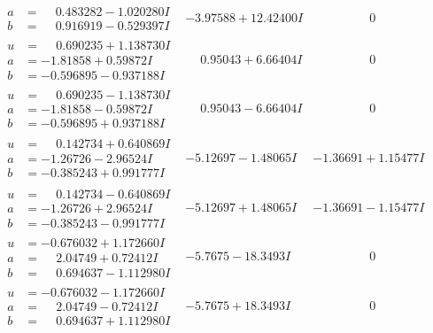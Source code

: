 \documentclass[1p]{elsarticle_modified}
\theoremstyle{definition}
\begin{document}
$$\begin{array}{c|c|c}
\begin{aligned}
a &= \phantom{-}0.483282 - 1.020280 I \\
b &= \phantom{-}0.916919 - 0.529397 I\end{aligned}
 & -3.97588 + 12.42400 I & \phantom{-0.000000 } 0 \\ \hline\begin{aligned}
u &= \phantom{-}0.690235 + 1.138730 I \\
a &= -1.81858 + 0.59872 I \\
b &= -0.596895 - 0.937188 I\end{aligned}
 & \phantom{-}0.95043 + 6.66404 I & \phantom{-0.000000 } 0 \\ \hline\begin{aligned}
u &= \phantom{-}0.690235 - 1.138730 I \\
a &= -1.81858 - 0.59872 I \\
b &= -0.596895 + 0.937188 I\end{aligned}
 & \phantom{-}0.95043 - 6.66404 I & \phantom{-0.000000 } 0 \\ \hline\begin{aligned}
u &= \phantom{-}0.142734 + 0.640869 I \\
a &= -1.26726 - 2.96524 I \\
b &= -0.385243 + 0.991777 I\end{aligned}
 & -5.12697 - 1.48065 I & -1.36691 + 1.15477 I \\ \hline\begin{aligned}
u &= \phantom{-}0.142734 - 0.640869 I \\
a &= -1.26726 + 2.96524 I \\
b &= -0.385243 - 0.991777 I\end{aligned}
 & -5.12697 + 1.48065 I & -1.36691 - 1.15477 I \\ \hline\begin{aligned}
u &= -0.676032 + 1.172660 I \\
a &= \phantom{-}2.04749 + 0.72412 I \\
b &= \phantom{-}0.694637 - 1.112980 I\end{aligned}
 & -5.7675 - 18.3493 I & \phantom{-0.000000 } 0 \\ \hline\begin{aligned}
u &= -0.676032 - 1.172660 I \\
a &= \phantom{-}2.04749 - 0.72412 I \\
b &= \phantom{-}0.694637 + 1.112980 I\end{aligned}
 & -5.7675 + 18.3493 I & \phantom{-0.000000 } 0 \\ \hline\begin{aligned}

\end{aligned}
\end{array}$$
\end{document}
